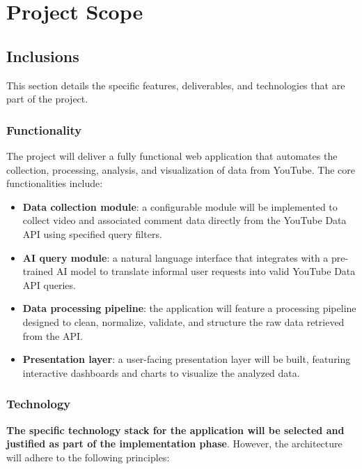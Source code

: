 \section{Project Scope}

\subsection{Inclusions}

This section details the specific features, deliverables, and technologies that are part of the project.

\subsubsection{Functionality}

The project will deliver a fully functional web application that automates the collection, processing, analysis, and visualization of data from YouTube. The core functionalities include:

\begin{itemize}
	\item \textbf{Data collection module}: a configurable module will be implemented to collect video and associated comment data directly from the YouTube Data API using specified query filters.

	\item \textbf{AI query module}: a natural language interface that integrates with a pre-trained AI model to translate informal user requests into valid YouTube Data API queries.

	\item \textbf{Data processing pipeline}: the application will feature a processing pipeline designed to clean, normalize, validate, and structure the raw data retrieved from the API.

	\item \textbf{Presentation layer}: a user-facing presentation layer will be built, featuring interactive dashboards and charts to visualize the analyzed data.
\end{itemize}

\subsubsection{Technology}

\textbf{The specific technology stack for the application will be selected and justified as part of the implementation phase}. However, the architecture will adhere to the following principles:

